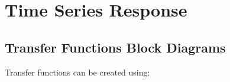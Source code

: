 \documentclass[12pt,letter]{article}
\begin{document}
%	
%	

	\setcounter{section}{4}	
	\setcounter{figure}{0}   
	\renewcommand\thefigure{\thesection.\arabic{figure}}


\section{Time Series Response}

\subsection{Transfer Functions Block Diagrams}


Transfer functions can be created using:
\end{document}
